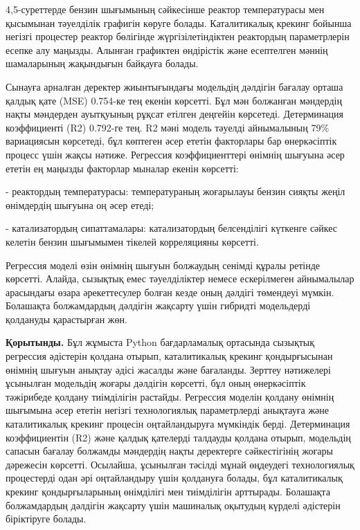 \begin{multicols}{2}
4,5-суреттерде бензин шығымының сәйкесінше реактор температурасы мен
қысымынан тәуелділік графигін көруге болады. Каталитикалық крекинг
бойынша негізгі процестер реактор бөлігінде жүргізілетіндіктен
реактордың параметрлерін есепке алу маңызды. Алынған графиктен
өндірістік және есептелген мәннің шамаларының жақындығын байқауға
болады.

Сынауға арналған деректер жиынтығындағы модельдің дәлдігін бағалау
орташа қалдық қате (MSE) 0.754-ке тең екенін көрсетті. Бұл мән болжанған
мәндердің нақты мәндерден ауытқуының рұқсат етілген деңгейін көрсетеді.
Детерминация коэффициенті (R2) 0.792-ге тең. R2 мәні модель тәуелді
айнымалының 79\% вариациясын көрсетеді, бұл көптеген әсер ететін
факторлары бар өнеркәсіптік процесс үшін жақсы нәтиже. Регрессия
коэффициенттері өнімнің шығуына әсер ететін ең маңызды факторлар мыналар
екенін көрсетті:

- реактордың температурасы: температураның жоғарылауы бензин сияқты
жеңіл өнімдердің шығуына оң әсер етеді;

- катализатордың сипаттамалары: катализатордың белсенділігі күткенге
сәйкес келетін бензин шығымымен тікелей корреляцияны көрсетті.

Регрессия моделі өзін өнімнің шығуын болжаудың сенімді құралы ретінде
көрсетті. Алайда, сызықтық емес тәуелділіктер немесе ескерілмеген
айнымалылар арасындағы өзара әрекеттесулер болған кезде оның дәлдігі
төмендеуі мүмкін. Болашақта болжамдардың дәлдігін жақсарту үшін гибридті
модельдерді қолдануды қарастырған жөн.

{\bfseries Қорытынды.} Бұл жұмыста Python бағдарламалық ортасында сызықтық
регрессия әдістерін қолдана отырып, каталитикалық крекинг қондырғысынан
өнімнің шығуын анықтау әдісі жасалды және бағаланды. Зерттеу нәтижелері
ұсынылған модельдің жоғары дәлдігін көрсетті, бұл оның өнеркәсіптік
тәжірибеде қолдану тиімділігін растайды. Регрессия моделін қолдану
өнімнің шығымына әсер ететін негізгі технологиялық параметрлерді
анықтауға және каталитикалық крекинг процесін оңтайландыруға мүмкіндік
берді. Детерминация коэффициентін (R2) және қалдық қателерді талдауды
қолдана отырып, модельдің сапасын бағалау болжамды мәндердің нақты
деректерге сәйкестігінің жоғары дәрежесін көрсетті. Осылайша, ұсынылған
тәсілді мұнай өңдеудегі технологиялық процестерді одан әрі оңтайландыру
үшін қолдануға болады, бұл каталитикалық крекинг қондырғыларының
өнімділігі мен тиімділігін арттырады. Болашақта болжамдардың дәлдігін
жақсарту үшін машиналық оқытудың күрделі әдістерін біріктіруге болады.
\end{multicols}

